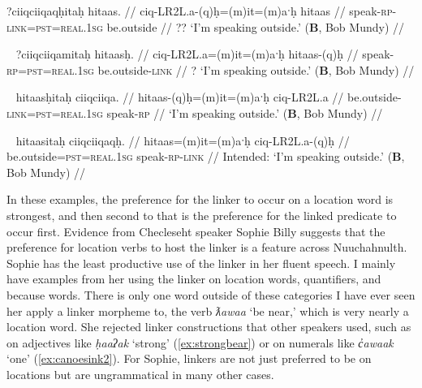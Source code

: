 \ex \label{ex:speakingoutside1}
\begingl
\glpreamble *?ciiqciiqaqḥitaḥ hitaas. //
\gla ciq-LR2L.a-(q)ḥ=(m)it=(m)aˑḥ hitaas //
\glb speak-\textsc{rp}-\textsc{link}=\textsc{pst}=\textsc{real.1sg} be.outside //
\glft ?? `I'm speaking outside.' (\textbf{B}, Bob Mundy) //
\endgl
\xe

\ex~ \label{ex:speakingoutside2}
\begingl
\glpreamble ?ciiqciiqamitaḥ hitaasḥ. //
\gla ciq-LR2L.a=(m)it=(m)aˑḥ hitaas-(q)ḥ //
\glb speak-\textsc{rp}=\textsc{pst}=\textsc{real.1sg} be.outside-\textsc{link} //
\glft ? `I'm speaking outside.' (\textbf{B}, Bob Mundy) //
\endgl
\xe

\ex~ \label{ex:speakingoutside3}
\begingl
\glpreamble hitaasḥitaḥ ciiqciiqa. //
\gla hitaas-(q)ḥ=(m)it=(m)aˑḥ ciq-LR2L.a //
\glb be.outside-\textsc{link}=\textsc{pst}=\textsc{real.1sg} speak-\textsc{rp} //
\glft `I'm speaking outside.' (\textbf{B}, Bob Mundy) //
\endgl
\xe

\ex~ \label{ex:speakingoutside4}
\begingl
\glpreamble *hitaasitaḥ ciiqciiqaqḥ. //
\gla hitaas=(m)it=(m)aˑḥ ciq-LR2L.a-(q)ḥ //
\glb be.outside=\textsc{pst}=\textsc{real.1sg} speak-\textsc{rp}-\textsc{link} //
\glft Intended: `I'm speaking outside.' (\textbf{B}, Bob Mundy) //
\endgl
\xe

In these examples, the preference for the linker to occur on a location word is strongest, and then second to that is the preference for the linked predicate to occur first. Evidence from Checleseht speaker Sophie Billy suggests that the preference for location verbs to host the linker is a feature across Nuuchahnulth. Sophie has the least productive use of the linker in her fluent speech. I mainly have examples from her using the linker on location words, quantifiers, and because words. There is only one word outside of these categories I have ever seen her apply a linker morpheme to, the verb \textit{ƛawaa} `be near,' which is very nearly a location word. She rejected linker constructions that other speakers used, such as on adjectives like \textit{ḥaaʔak} `strong' (\ref{ex:strongbear}) or on numerals like \textit{c̓awaak} `one' (\ref{ex:canoesink2}). For Sophie, linkers are not just preferred to be on locations but are ungrammatical in many other cases.

\begin{comment}
\ex \label{speakingoutside1}
\begingl
\glpreamble ƛ̓aaʔaasḥiis ciiqmałap. //
\gla ƛ̓aaʔaas-(q)ḥ=(y)iis ciiqmałapa //
\glb outide-\textsc{link}=\textsc{weak.1sg} speak.publicly //
\glft `I'm speaking outside.' (\textbf{Q}, Sophie Billy) //
\endgl
\xe

\ex~ \label{speakingoutside2}
\begingl
\glpreamble ciiqmałapayiis hiłḥ ƛ̓aaʔaas. //
\gla ciiqmałapa=(y)iis hił-(q)ḥ ƛ̓aaʔaas //
\glb speak.publicly=\textsc{weak.1sg} be.at-\textsc{link} outside //
\glft `I'm speaking outside.' (\textbf{Q}, Sophie Billy) //
\endgl
\xe

\ex~ \label{*speakingoutside3}
\begingl
\glpreamble *ciiqmałapḥiis ƛ̓aaʔaas. //
\gla ciiqmałapa-(q)ḥ=(y)iis hił-(q)ḥ ƛ̓aaʔaas //
\glb speak.publicly-\textsc{link}=\textsc{weak.1sg} be.at-\textsc{link} outside //
\glft Intended: `I'm speaking outside.' (\textbf{Q}, Sophie Billy) //
\endgl
\xe
\end{comment}

